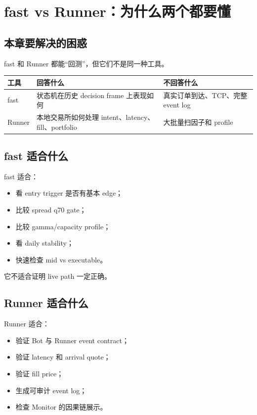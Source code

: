\chapter{fast vs Runner：为什么两个都要懂}

\section{本章要解决的困惑}

fast 和 Runner 都能“回测”，但它们不是同一种工具。

\begin{longtable}{p{}p{}p{}}
\toprule
工具 & 回答什么 & 不回答什么 \\
\midrule
fast & 状态机在历史 decision frame 上表现如何 & 真实订单到达、TCP、完整 event log \\
Runner & 本地交易所如何处理 intent、latency、fill、portfolio & 大批量扫因子和 profile \\
\bottomrule
\end{longtable}

\section{fast 适合什么}

fast 适合：

\begin{itemize}[leftmargin=2em]
  \item 看 entry trigger 是否有基本 edge；
  \item 比较 spread q70 gate；
  \item 比较 gamma/capacity profile；
  \item 看 daily stability；
  \item 快速检查 mid vs executable。
\end{itemize}

它不适合证明 live path 一定正确。

\section{Runner 适合什么}

Runner 适合：

\begin{itemize}[leftmargin=2em]
  \item 验证 Bot 与 Runner event contract；
  \item 验证 latency 和 arrival quote；
  \item 验证 fill price；
  \item 生成可审计 event log；
  \item 检查 Monitor 的因果链展示。
\end{itemize}

